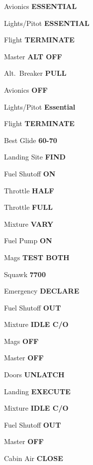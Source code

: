 \documentclass{article}
\begin{document}
\begin{multicols*}{3}
Avionics \dotfill \textbf{ESSENTIAL}

Lights/Pitot \dotfill \textbf{ESSENTIAL}

Flight \dotfill \textbf{TERMINATE}

\colorbox{orange!80}{}

\colorbox{yellow!80!orange}{}

Master \dotfill \textbf{ALT OFF}

Alt.\ Breaker \dotfill \textbf{PULL}

Avionics \dotfill \textbf{OFF}

Lights/Pitot \dotfill \textbf{Essential}

Flight \dotfill \textbf{TERMINATE}

\colorbox{red!80}{}

Best Glide \dotfill \textbf{60-70}

Landing Site \dotfill \textbf{FIND}

Fuel Shutoff \dotfill \textbf{ON}

Throttle \dotfill \textbf{HALF}

Throttle \dotfill \textbf{FULL}

Mixture \dotfill \textbf{VARY}

Fuel Pump \dotfill \textbf{ON}

Mags \dotfill \textbf{TEST BOTH}

\colorbox{orange!80}{}

Squawk \dotfill \textbf{7700}

Emergency \dotfill \textbf{DECLARE}

Fuel Shutoff \dotfill \textbf{OUT}

Mixture \dotfill \textbf{IDLE C/O}

Mags \dotfill \textbf{OFF}

Master \dotfill \textbf{OFF}

Doors \dotfill \textbf{UNLATCH}

Landing \dotfill \textbf{EXECUTE}

\colorbox{red!80}{}

Mixture \dotfill \textbf{IDLE C/O}

Fuel Shutoff \dotfill \textbf{OUT}

Master \dotfill \textbf{OFF}

Cabin Air \dotfill \textbf{CLOSE}


\end{multicols*}
\end{document}
